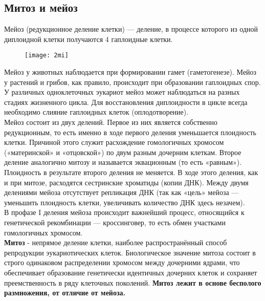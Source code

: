 	\subsection{Митоз и мейоз}
	Мейоз (редукционное деление клетки) — деление, в процессе которого из одной диплоидной клетки получаются 4 гаплоидные клетки.
	\begin{figure}[H]
		\texttt{[image: 2mi]}
	\end{figure}
Мейоз у животных наблюдается при формировании гамет (гаметогенезе). Мейоз у растений и грибов, как правило, происходит при образовании гаплоидных спор. У различных одноклеточных эукариот мейоз может наблюдаться на разных стадиях жизненного цикла. Для восстановления диплоидности в цикле всегда необходимо слияние гаплоидных клеток (оплодотворение).\\
Мейоз состоит из двух делений. Первое из них является собственно редукционным, то есть именно в ходе первого деления уменьшается плоидность клетки. Причиной этого служит расхождение гомологичных хромосом («материнской» и «отцовской») по двум разным дочерним клеткам. Второе деление аналогично митозу и называется эквационным (то есть «равным»). Плоидность в результате второго деления не меняется. В ходе этого деления, как и при митозе, расходятся сестринские хроматиды (копии ДНК). Между двумя делениями мейоза отсутствует репликация ДНК (так как «цель» мейоза — уменьшить плоидность клетки, увеличивать количество ДНК здесь незачем).\\
В профазе I деления мейоза происходит важнейший процесс, относящийся к генетической рекомбинации — кроссинговер, то есть обмен участками гомологичных хромосом.\\

	\textbf{Митоз} - непрямое деление клетки, наиболее распространённый способ репродукции эукариотических клеток. Биологическое значение митоза состоит в строго одинаковом распределении хромосом между дочерними ядрами, что обеспечивает образование генетически идентичных дочерних клеток и сохраняет преемственность в ряду клеточных поколений. \textbf{Митоз лежит в основе бесполого размножения, от отличие от мейоза.}
	\newpage